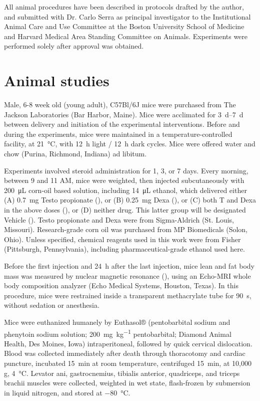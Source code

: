 \documentclass[12pt,english]{report}\usepackage[]{graphicx}\usepackage[]{color}
\begin{document}
All animal procedures have been described in protocols drafted by
the author, and submitted with Dr. Carlo Serra as principal investigator
to the Institutional Animal Care and Use Committee at the Boston University
School of Medicine and Harvard Medical Area Standing Committee on
Animals. Experiments were performed solely after approval was obtained.


\section{Animal studies}

Male, 6-8 week old (young adult), C57Bl/6J mice were purchased from
The Jackson Laboratories (Bar Harbor, Maine). Mice were acclimated
for \SIrange{3}{7}{\day} between delivery and initiation of the experimental
interventions. Before and during the experiments, mice were maintained
in a temperature-controlled facility, at \SI{21}{\celsius}, with
\SI{12}{\hour} light / \SI{12}{\hour} dark cycles. Mice were offered
water and chow (Purina, Richmond, Indiana) ad libitum.

Experiments involved steroid administration for 1, 3, or 7 days. Every
morning, between 9 and 11 AM, mice were weighted, then injected subcutaneously
with \SI{200}{\micro\liter} corn-oil based solution, including \SI{14}{\micro\liter}
ethanol, which delivered either (A) \SI{0.7}{\milli\gram} Testo propionate
(), or (B) \SI{0.25}{\milli\gram}
Dexa (), or (C) both T
and Dexa in the above doses (),
or (D) neither drug. This latter group will be designated Vehicle
(). Testo propionate and Dexa were
from Sigma-Aldrich (St. Louis, Missouri). Research-grade corn oil
was purchased from MP Biomedicals (Solon, Ohio). Unless specified,
chemical reagents used in this work were from Fisher (Pittsburgh,
Pennsylvania), including pharmaceutical-grade ethanol used here.

Before the first injection and \SI{24}{\hour} after the last injection,
mice lean and fat body mass was measured by nuclear magnetic resonance
(), using an Echo-MRI
whole body composition analyzer (Echo Medical Systems, Houston, Texas).
In this procedure, mice were restrained inside a transparent methacrylate
tube for \SI{90}{\second}, without sedation or anesthesia.

Mice were euthanized humanely by Euthasol® (pentobarbital sodium and
phenytoin sodium solution; \SI{200}{\milli\gram\per\kilo\gram} pentobarbital;
Diamond Animal Health, Des Moines, Iowa) intraperitoneal, followed
by quick cervical dislocation. Blood was collected immediately after
death through thoracotomy and cardiac puncture, incubated \SI{15}{\minute}
at room temperature, centrifuged \SI{15}{\minute}, at 10,000 g, \SI{4}{\celsius}.
Levator ani, gastrocnemius, tibialis anterior, quadriceps, and triceps
brachii muscles were collected, weighted in wet state, flash-frozen
by submersion in liquid nitrogen, and stored at \SI{-80}{\celsius}.
\end{document}
